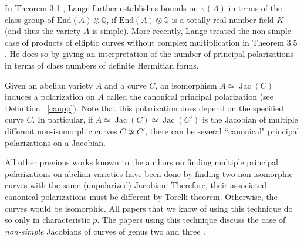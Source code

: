 \documentclass[12pt,reqno]{amsart}
\DeclareMathOperator{\Jac}{Jac}
\newcommand{\Q}{\mathbb{Q}}
\theoremstyle{definition}
\theoremstyle{remark}
\newtheorem*{remark}{Remark}
\begin{document}
In Theorem 3.1 \cite{several}, Lange further establishes bounds on $\pi(A)$ in terms of the class group of $\text{End}(A) \otimes \Q$, if $\text{End}(A) \otimes \Q$ is a totally real number field $K$ (and thus the variety $A$ is simple). More recently, Lange treated the non-simple case of products of elliptic curves without complex multiplication in Theorem 3.5 \cite{newlange}. He does so by giving an interpretation of the number of principal polarizations in terms of class numbers of definite Hermitian forms.



Given an abelian variety $A$ and a curve $C$, an isomorphism $A \simeq \Jac(C)$ induces a polarization on $A$ called the canonical principal polarization (see Definition ~\ref{canpp}). Note that this polarization does depend on the specified curve $C$. In particular, if $A \simeq \Jac(C) \simeq \Jac(C')$ is the Jacobian of multiple different non-isomorphic curves $C \not\simeq C'$, there can be several ``canonical" principal polarizations on a Jacobian.


All other previous works known to the authors on finding multiple principal polarizations on abelian varieties have been done by finding two non-isomorphic curves with the same (unpolarized) Jacobian. Therefore, their associated canonical polarizations must be different by Torelli theorem. Otherwise, the curves would be isomorphic. All papers that we know of using this technique do so only in characteristic $p$. The papers using this technique discuss the case of \textit{non-simple} Jacobians of curves of genus two \cite{iko} and three \cite{brock}.
\end{document}
